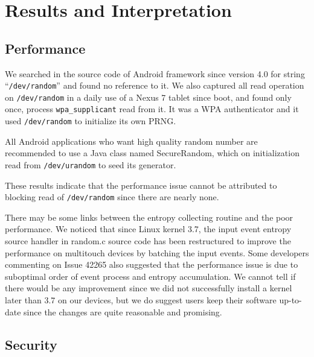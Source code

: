\section{Results and Interpretation}


\subsection{Performance}

We searched in the source code of Android framework since version 4.0 for string ``\verb|/dev/random|'' and found no reference to it. We also captured all read operation on \verb|/dev/random| in a daily use of a Nexus 7 tablet since boot, and found only once, process \verb|wpa_supplicant| read from it. It was a WPA authenticator and it used \verb|/dev/random| to initialize its own PRNG.

All Android applications who want high quality random number are recommended to use a Java class named SecureRandom, which on initialization read from \verb|/dev/urandom| to seed its generator.

These results indicate that the performance issue cannot be attributed to blocking read of \verb|/dev/random| since there are nearly none.

There may be some links between the entropy collecting routine and the poor performance. We noticed that since Linux kernel 3.7, the input event entropy source handler in random.c source code has been restructured \cite{commit43} to improve the performance on multitouch devices by batching the input events. Some developers commenting on Issue 42265 also suggested that the performance issue is due to suboptimal order of event process and entropy accumulation. We cannot tell if there would be any improvement since we did not successfully install a kernel later than 3.7 on our devices, but we do suggest users keep their software up-to-date since the changes are quite reasonable and promising.

\subsection{Security}

